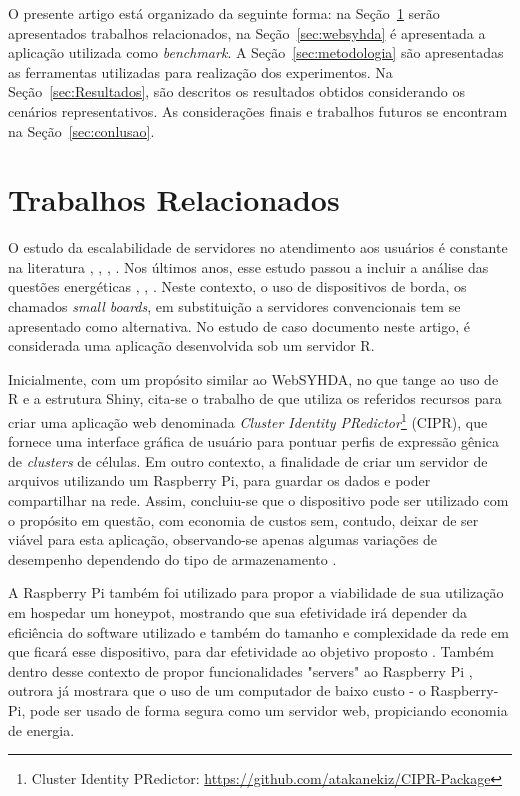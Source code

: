 \documentclass[12pt,english,brazil]{article}
\begin{document}
O presente artigo está organizado da seguinte forma: na Seção~\ref{sec:TrabalhosRelacionados} serão apresentados trabalhos relacionados, na Seção~\ref{sec:websyhda} é apresentada a aplicação utilizada como \emph{benchmark}. A Seção~\ref{sec:metodologia} são apresentadas as ferramentas utilizadas para realização dos experimentos. Na Seção~\ref{sec:Resultados}, são descritos os resultados obtidos considerando os cenários representativos. As considerações finais e trabalhos futuros se encontram na Seção~\ref{sec:conlusao}.

\section{Trabalhos Relacionados} \label{sec:TrabalhosRelacionados}

O estudo da escalabilidade de servidores no atendimento aos usuários é constante na literatura \cite{generic1}, \cite{generic5}, \cite{generic3}, \cite{generic4}. Nos últimos anos, esse estudo passou a incluir a análise das questões
energéticas \cite{generic6}, \cite{generic7}, \cite{generic8}. Neste contexto, o uso de dispositivos de borda, os chamados \emph{small
boards}, em substituição a servidores convencionais tem se apresentado como alternativa. No estudo de caso documento neste artigo, é considerada uma aplicação desenvolvida sob um servidor R.

Inicialmente, com um propósito similar ao WebSYHDA, no que tange ao uso de R e a estrutura Shiny, cita-se o  trabalho de \cite{CIPR} que utiliza os referidos recursos para criar uma aplicação web denominada \emph{Cluster Identity PRedictor}\footnote{Cluster Identity PRedictor: \url{https://github.com/atakanekiz/CIPR-Package}} (CIPR), que fornece uma interface gráfica de usuário para pontuar perfis de expressão gênica de \emph{clusters} de células.
Em outro contexto, a finalidade de criar um servidor de arquivos utilizando um Raspberry Pi, para guardar os dados e poder compartilhar na rede. Assim, concluiu-se que o dispositivo pode ser utilizado com o propósito em questão, com economia de custos sem, contudo, deixar de ser viável para esta aplicação, observando-se apenas algumas variações de desempenho dependendo do tipo de armazenamento \cite{bruschi2016teste}.

A Raspberry Pi também foi utilizado para propor a viabilidade de sua utilização em hospedar um honeypot, mostrando que sua efetividade irá depender da eficiência do software utilizado e também do tamanho e complexidade da rede em que ficará esse dispositivo, para dar efetividade ao objetivo proposto \cite{honeypot}. Também dentro desse contexto de propor funcionalidades "servers" ao Raspberry Pi \cite{inproceedings}, outrora já mostrara que o uso de um computador de baixo custo - o Raspberry-Pi, pode ser usado de forma segura como um servidor web,  propiciando economia de energia.
\end{document}
